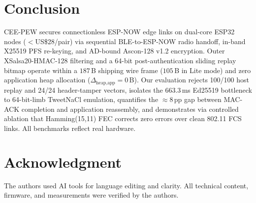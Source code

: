 \documentclass[conference]{IEEEtran}
\begin{document}
\section{Conclusion}
CEE-PEW secures connectionless ESP-NOW edge links on dual-core ESP32 nodes ($<$US\$28/pair) via sequential BLE-to-ESP-NOW radio handoff, in-band X25519 PFS re-keying, and AD-bound Ascon-128 v1.2 encryption. Outer XSalsa20-HMAC-128 filtering and a 64-bit post-authentication sliding replay bitmap operate within a $187$\,B shipping wire frame ($105$\,B in Lite mode) and zero application heap allocation ($\Delta_{\text{heap,app}}=0$\,B). Our evaluation rejects 100/100 host replay and 24/24 header-tamper vectors, isolates the $663.3$\,ms Ed25519 bottleneck to 64-bit-limb TweetNaCl emulation, quantifies the $\approx 8$\,pp gap between MAC-ACK completion and application reassembly, and demonstrates via controlled ablation that Hamming(15,11) FEC corrects zero errors over clean 802.11 FCS links. All benchmarks reflect real hardware.

\section*{Acknowledgment}
The authors used AI tools for language editing and clarity. All technical content, firmware, and measurements were verified by the authors.
\end{document}
